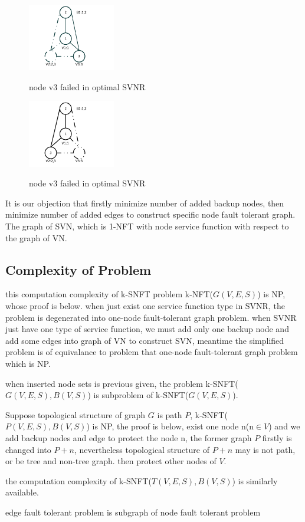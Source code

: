\begin{figure}
\centering
\includegraphics[width=1.5in]{Fig/SVNR_opt_n2}\\
\caption{node v3 failed in optimal SVNR}\label{fig:optgraph_n2_fail}
\end{figure}

\begin{figure}
\centering
\includegraphics[width=1.5in]{Fig/SVNR_opt_n3}\\
\caption{node v3 failed in optimal SVNR}\label{fig:optgraph_n3_fail}
\end{figure}



It is our objection that firstly minimize number of added backup nodes, then minimize number of added edges to construct specific node fault tolerant graph. The graph of SVN, which is 1-NFT with node service function with respect to the graph of VN.



\subsection{Complexity of Problem}
\label{sec:Complexity}
this computation complexity of k-SNFT problem k-NFT($G(V,E,S)$) is NP, whose proof is below. when just exist one service function type in SVNR, the problem is degenerated into one-node fault-tolerant graph problem. when SVNR just have one type of service function, we must add only one backup node and add some edges into graph of VN to construct SVN, meantime the simplified problem is of equivalance to problem that one-node fault-tolerant graph problem which is NP.

when inserted node sets is previous given, the problem k-SNFT($G(V,E,S),B(V,S)$) is subproblem of k-SNFT($G(V,E,S)$).

Suppose topological structure of graph $G$ is path $P$, k-SNFT($P(V,E,S),B(V,S)$) is NP, the proof is below, exist one node n(n$\in V$) and we add backup nodes and edge to protect the node n, the former graph $P$ firstly is changed into $P+n$, nevertheless topological structure of $P+n$ may is not path, or be tree and non-tree graph. then protect other nodes of $V$.

the computation complexity of k-SNFT($T(V,E,S),B(V,S)$) is similarly available.

edge fault tolerant problem is subgraph of node fault tolerant problem
